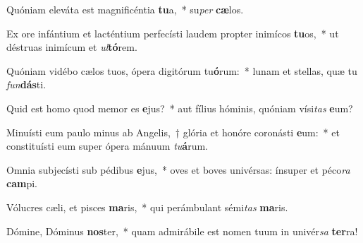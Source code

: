 \item Quóniam eleváta est magnificéntia \textbf{tu}a,~* su\textit{per} \textbf{cæ}los.
\item Ex ore infántium et lacténtium perfecísti laudem propter inimícos \textbf{tu}os,~* ut déstruas inimícum et \textit{ul}\textbf{tó}rem.
\item Quóniam vidébo cælos tuos, ópera digitórum tu\textbf{ó}rum:~* lunam et stellas, quæ tu \textit{fun}\textbf{dás}ti.
\item Quid est homo quod memor es \textbf{e}jus?~* aut fílius hóminis, quóniam vísi\textit{tas} \textbf{e}um?
\item Minuísti eum paulo minus ab Angelis,~† glória et honóre coronásti \textbf{e}um:~* et constituísti eum super ópera mánuum \textit{tu}\textbf{á}rum.
\item Omnia subjecísti sub pédibus \textbf{e}jus,~* oves et boves univérsas: ínsuper et péco\textit{ra} \textbf{cam}pi.
\item Vólucres cæli, et pisces \textbf{ma}ris,~* qui perámbulant sémi\textit{tas} \textbf{ma}ris.
\item Dómine, Dóminus \textbf{nos}ter,~* quam admirábile est nomen tuum in univér\textit{sa} \textbf{ter}ra!
